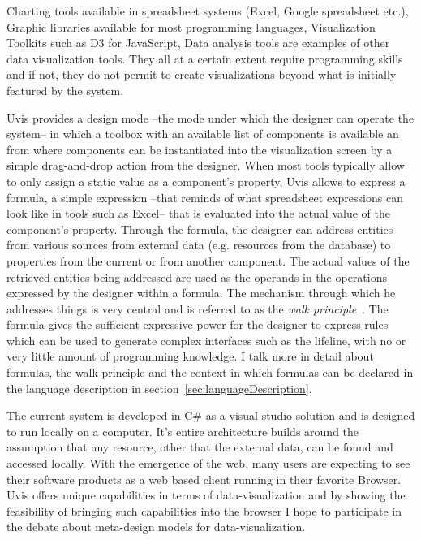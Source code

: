 Charting tools available in spreadsheet systems (Excel, Google spreadsheet etc.), Graphic libraries available for most programming languages, Visualization Toolkits such as D3 for JavaScript, Data analysis tools are examples of other data visualization tools. They all at a certain extent require programming skills and if not, they do not permit to create visualizations beyond what is initially featured by the system.~\cite{lauesen2013}

Uvis provides a design mode --the mode under which the designer can operate the system-- in which a toolbox with an available list of components is available an from where components can be instantiated into the visualization screen by a simple drag-and-drop action from the designer. When most tools typically allow to only assign a static value as a component's property, Uvis allows to express a formula, a simple expression --that reminds of what spreadsheet expressions can look like in tools such as Excel-- that is evaluated into the actual value of the component's property. Through the formula, the designer can address entities from various sources from external data (e.g. resources from the database) to properties from the current or from another component. The actual values of the retrieved entities being addressed are used as the operands in the operations expressed by the designer within a formula. The mechanism through which he addresses things is very central and is referred to as the \emph{walk principle}~\cite{lauesen2013}. The formula gives the sufficient expressive power for the designer to express rules which can be used to generate complex interfaces such as the lifeline, with no or very little amount of programming knowledge. I talk more in detail about formulas, the walk principle and the context in which formulas can be declared in the language description in section~\ref{sec:languageDescription}.

The current system is developed in C\# as a visual studio solution and is designed to run locally on a computer. It's entire architecture builds around the assumption that any resource, other that the external data, can be found and accessed locally. With the emergence of the web, many users are expecting to see their software products as a web based client running in their favorite Browser. Uvis offers unique capabilities in terms of data-visualization and by showing the feasibility of bringing such capabilities into the browser I hope to participate in the debate about meta-design models for data-visualization. 